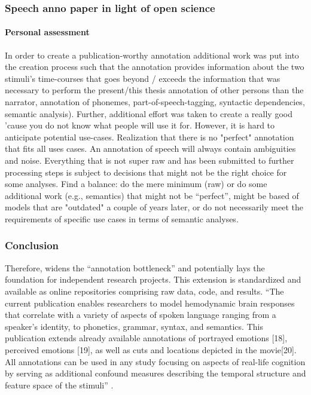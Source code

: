 \subsubsection{Speech anno paper in light of open science}

\paragraph{Personal assessment}


%

%
In order to create a publication-worthy annotation additional work was put into
the creation process such that the annotation provides information about the
two stimuli's time-courses that goes beyond / exceeds the information that was
necessary to perform the present/this thesis
%
annotation of other persons than the narrator, annotation of phonemes,
part-of-speech-tagging, syntactic dependencies, semantic analysis).
%
Further, additional effort was taken to create a really good 'cause you do not
know what people will use it for.
%
However, it is hard to anticipate potential use-cases.
%
Realization that there is no "perfect" annotation that fits all uses cases.
%
An annotation of speech will always contain ambiguities and noise.
%
Everything that is not super raw and has been submitted to further processing
steps is subject to decisions that might not be the right choice for some
analyses.
%
Find a balance: do the mere minimum (raw) or do some additional work (e.g.,
semantics) that might not be ``perfect'', might be based of models that are
"outdated" a couple of years later, or do not necessarily meet the requirements
of specific use cases in terms of semantic analyses.


\subsubsection{Conclusion}
%
Therefore, widens the ``annotation bottleneck'' \citep{aliko2020naturalistic}
and potentially lays the foundation for independent research projects.
%
This extension is standardized and available as online repositories comprising
raw data, code, and results.
%
``The current publication enables researchers to model hemodynamic brain
responses that correlate with a variety of aspects of spoken language ranging
from a speaker's identity, to phonetics, grammar, syntax, and semantics.
%
This publication extends already available annotations of portrayed emotions
[18], perceived emotions [19], as well as cuts and locations depicted in the
movie[20].
%
All annotations can be used in any study focusing on aspects of real-life
cognition by serving as additional confound measures describing the temporal
structure and feature space of the stimuli'' \citep{haeusler2021speechanno}.



